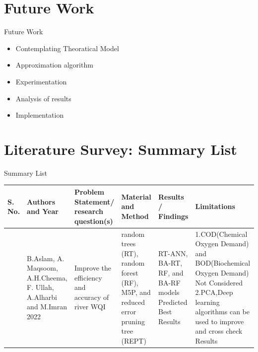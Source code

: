 \documentclass[11pt]{beamer}
\begin{document}
\section{Future Work}

    \begin{frame}{Future Work}
        \begin{itemize}
            \item Contemplating Theoratical Model 
            \item Approximation algorithm
            \item Experimentation
            \item Analysis of results 
            \item Implementation
        \end{itemize}
        
    \end{frame}

\section{Literature Survey: Summary List}
\begin{frame}{Summary List}
        \centering
        \scriptsize \begin{tabular}{|p{0.3cm}|p{1.3cm}|p{1.9cm}|p{1.3cm}|p{1.9cm}|p{2.2cm}|} 
            \hline
             \textbf{S. No.} & \textbf{Authors and Year}  &\textbf{Problem Statement/ research question(s)}  & \textbf{Material and Method}  & \textbf{Results} / Findings & \textbf{Limitations }\\ 
             \hline
            \cite{1} & B.Aslam, A. Maqsoom, A.H.Cheema, F. Ullah, A.Alharbi and M.Imran 2022 & Improve the efficiency and accuracy of river WQI & 
            random trees (RT), random forest (RF), M5P, and reduced error pruning tree (REPT) & RT-ANN, BA-RT, RF, and BA-RF models Predicted Best Results & 1.COD(Chemical Oxygen Demand) and BOD(Biochemical Oxygen Demand) Not Considered 2.PCA,Deep learning algorithms can be used to improve and cross check Results\\
            \hline
        \end{tabular}

        \label{tab:sum_list}

\end{frame}
\end{document}
